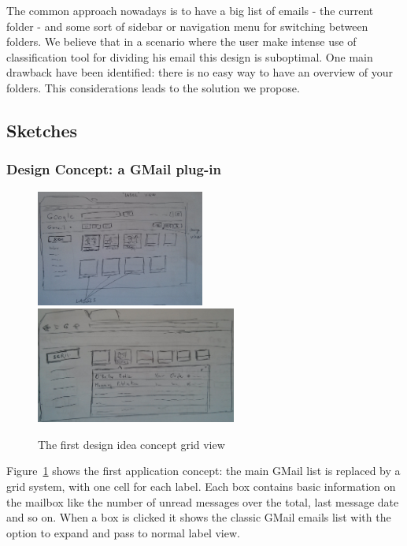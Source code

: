 \documentclass[a4paper,12pt]{report}
\begin{document}
The common approach nowadays is to have a big list of emails - the current folder - and some sort of sidebar or navigation menu for switching between folders. 
We believe that in a scenario where the user make intense use of classification tool for dividing his email this design is suboptimal.
One main drawback have been identified: there is no easy way to have an overview of your folders.
This considerations leads to the solution we propose.

\subsection{Sketches}

\subsubsection{Design Concept: a GMail plug-in}
\begin{figure}[H]
  \centering
  \includegraphics[height=1.5in]{old_grid}
  \includegraphics[height=1.5in]{old_grid_open}
  \caption{The first design idea concept grid view}
  \label{fig:old1}
\end{figure}
Figure~\ref{fig:old1} shows the first application concept: the main GMail list is replaced by a grid system, with one cell for each label. Each box contains basic information on the mailbox like the number of unread messages over the total, last message date and so on.
When a box is clicked it shows the classic GMail emails list with the option to expand and pass to normal label view. 
\end{document}
